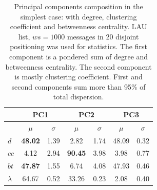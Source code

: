 \documentclass[%
 aip,
 jmp,%
 amsmath,amssymb,
 reprint,%
]{revtex4-1}
\begin{document}
\begin{table}[H]
  \centering
  \caption{Principal components composition in the simplest case: with degree, clustering coefficient and betweenness centrality. LAU list, $ws=1000$ messages in 20 disjoint positioning was used for statistics. The first component is a pondered sum of degree and betweenness centrality. The second component is mostly clustering coefficient. First and second components sum more than 95\% of total dispersion.}
  \begin{tabular}{|l|c|c| c|c| c|c|}\hline
 & \multicolumn{2}{c|}{PC1}          & \multicolumn{2}{c|}{PC2} & \multicolumn{2}{c|}{PC3}  \\\hline
       & $\mu$            & $\sigma$ & $\mu$         & $\sigma$ & $\mu$ & $\sigma$  \\\hline
$d$       & {\bf 48.02}   & 1.39     & 2.82          & 1.74     & 48.09  & 0.32 \\
$cc$      & 4.12          & 2.94     & {\bf 90.45}   & 3.98     & 3.98  & 0.77 \\ 
$bt$      & {\bf 47.87}   & 1.55     & 6.74          & 4.08     & 47.93 & 0.46 \\ \hline
$\lambda$ & 64.67         & 0.52     & 33.26         & 0.23     & 2.08  & 0.40 \\ \hline
  \end{tabular}
  \label{compPCA0}
\end{table}
\end{document}
